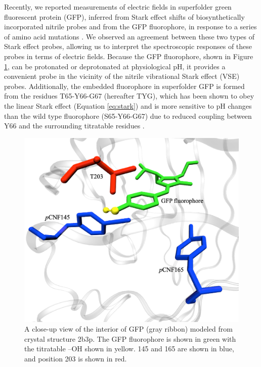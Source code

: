 Recently, we reported measurements of electric fields in superfolder green fluorescent protein (GFP), inferred from Stark effect shifts of biosynthetically incorporated nitrile probes and from the GFP fluorophore, in response to a series of amino acid mutations \cite{Slocum2016}.
We observed an agreement between these two types of Stark effect probes, allowing us to interpret the spectroscopic responses of these probes in terms of electric fields. 
Because the GFP fluorophore, shown in Figure \ref{fig:system}, can be protonated or deprotonated at physiological pH, it provides a convenient \pKa{} probe in the vicinity of the nitrile vibrational Stark effect (VSE) probes. 
Additionally, the embedded fluorophore in superfolder GFP is formed from the residues T65-Y66-G67 (hereafter TYG), which has been shown to obey the linear Stark effect\cite{Bublitz1998} (Equation \ref{eq:stark}) and is more sensitive to pH changes than the wild type fluorophore (S65-Y66-G67) due to reduced coupling between Y66 and the surrounding titratable residues \cite{Oltrogge2012, Brejc1997}.

\begin{figure}
    \center
    \includegraphics[width=\single]{figures-gfp-pKa/system.png}
    \caption[Probe and T203 locations near the GFP fluorophore]{
        A close-up view of the interior of GFP (gray ribbon) modeled from crystal structure 2b3p. 
        The GFP fluorophore is shown in green with the titratable --OH shown in yellow. 
        \pCNF{} 145 and 165 are shown in blue, and position 203 is shown in red.
    }
    \label{fig:system}
\end{figure}

